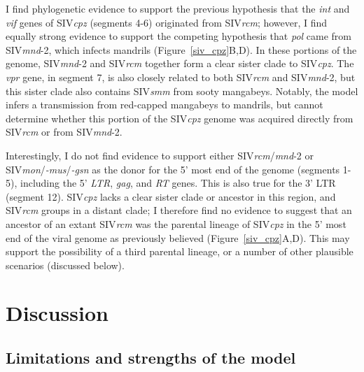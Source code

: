 I find phylogenetic evidence to support the previous hypothesis \citep{bailes2003hybrid,etienne2013gene} that the \textit{int} and \textit{vif} genes of SIV\textit{cpz} (segments 4-6) originated from SIV\textit{rcm}; however, I find equally strong evidence to support the competing hypothesis that \textit{pol} came from SIV\textit{mnd}-2, which infects mandrils (Figure~\ref{siv_cpz}B,D).
In these portions of the genome, SIV\textit{mnd}-2 and SIV\textit{rcm} together form a clear sister clade to SIV\textit{cpz}.
The \textit{vpr} gene, in segment 7, is also closely related to both SIV\textit{rcm} and SIV\textit{mnd}-2, but this sister clade also contains SIV\textit{smm} from sooty mangabeys.
Notably, the model infers a transmission from red-capped mangabeys to mandrils, but cannot determine whether this portion of the SIV\textit{cpz} genome was acquired directly from SIV\textit{rcm} or from SIV\textit{mnd}-2.

Interestingly, I do not find evidence to support either SIV\textit{rcm}/\textit{mnd}-2 or SIV\textit{mon}/\textit{-mus}/\textit{-gsn} as the donor for the 5' most end of the genome (segments 1-5), including the 5' \textit{LTR}, \textit{gag}, and \textit{RT} genes.
This is also true for the 3' LTR (segment 12).
SIV\textit{cpz} lacks a clear sister clade or ancestor in this region, and SIV\textit{rcm} groups in a distant clade; I therefore find no evidence to suggest that an ancestor of an extant SIV\textit{rcm} was the parental lineage of SIV\textit{cpz} in the 5' most end of the viral genome as previously believed (Figure~\ref{siv_cpz}A,D).
This may support the possibility of a third parental lineage, or a number of other plausible scenarios (discussed below).


\section{Discussion}

\subsection{Limitations and strengths of the model}
